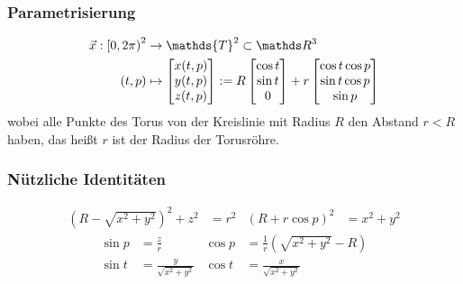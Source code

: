     \subsubsection{Parametrisierung}
      \begin{align}
      \begin{aligned}
        \vec{x}: \left[ 0, 2\pi \right)^{2}
                    &\rightarrow \mathds{T}^{2} \subset \R^{3} \\
             \left( t,p \right) 
                    &\mapsto\begin{bmatrix}
                              x(t,p) \\ y(t,p) \\ z(t,p)
                            \end{bmatrix}
                    :=R \begin{bmatrix}
                          \cos t \\
                          \sin t \\
                            0
                        \end{bmatrix}
                      +r\begin{bmatrix}
                        \cos t \cos p \\
                        \sin t \cos p \\
                        \sin p
                      \end{bmatrix}
      \end{aligned}
      \end{align}
      wobei alle Punkte des Torus von der Kreislinie mit Radius \( R \) den Abstand \( r < R \) haben,
      das heißt \( r \) ist der Radius der Torusröhre. 

    \subsubsection{Nützliche Identitäten}
      \begin{align}
        \left( R - \sqrt{x^{2}+y^{2}} \right)^{2} + z^{2} &= r^{2} 
        & \left( R + r\cos p \right)^{2} &= x^{2} + y^{2}
      \end{align}
      \begin{align}
        \sin p &= \frac{z}{r} &                  \cos p &= \frac{1}{r}\left( \sqrt{x^{2}+y^{2}} - R \right)\\
        \sin t &= \frac{y}{\sqrt{x^{2}+y^{2}}} & \cos t &= \frac{x}{\sqrt{x^{2}+y^{2}}}
      \end{align}

